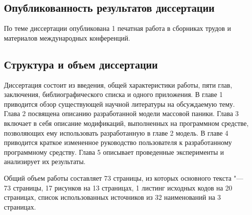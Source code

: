 \subsection*{\textbf{Опубликованность результатов диссертации}}

По теме диссертации опубликована 1 печатная работа в сборниках трудов и материалов международных конференций.

\subsection*{\textbf{Структура и объем диссертации}}

Диссертация состоит из введения, общей характеристики работы, пяти глав, заключения, библиографического списка и одного приложения.
В главе 1 приводится обзор существующей научной литературы на обсуждаемую тему. Глава 2 посвящена описанию разработанной модели массовой паники.
Глава 3 включает в себя описание модификаций, выполненных на программном средстве, позволяющих ему использовать разработанную в главе 2 модель.
В главе 4 приводится краткое измененное руководство пользователя к разработанному программному средству.
Глава 5 описывает проведенные эксперименты и анализирует их результаты.

Общий объем работы составляет 73 страницы, из которых основного текста "--- 73 страницы, 17 рисунков на 13 страницах, 1 листинг исходных кодов на 20 страницах,
список использованных источников из 32 наименований на 3 страницах.

